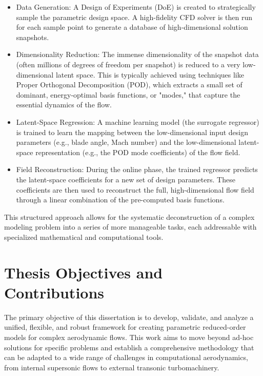 \documentclass[dscexam, EN]{ufabcFHZh}
\begin{document}
\begin{itemize}
    \item Data Generation: A Design of Experiments (DoE) is created to strategically sample the parametric design space. A high-fidelity CFD solver is then run for each sample point to generate a database of high-dimensional solution snapshots.
    
    \item Dimensionality Reduction: The immense dimensionality of the snapshot data (often millions of degrees of freedom per snapshot) is reduced to a very low-dimensional latent space. This is typically achieved using techniques like Proper Orthogonal Decomposition (POD), which extracts a small set of dominant, energy-optimal basis functions, or "modes," that capture the essential dynamics of the flow.

    \item Latent-Space Regression: A machine learning model (the surrogate regressor) is trained to learn the mapping between the low-dimensional input design parameters (e.g., blade angle, Mach number) and the low-dimensional latent-space representation (e.g., the POD mode coefficients) of the flow field.

    \item Field Reconstruction: During the online phase, the trained regressor predicts the latent-space coefficients for a new set of design parameters. These coefficients are then used to reconstruct the full, high-dimensional flow field through a linear combination of the pre-computed basis functions.
\end{itemize}

This structured approach allows for the systematic deconstruction of a complex modeling problem into a series of more manageable tasks, each addressable with specialized mathematical and computational tools.

\section{Thesis Objectives and Contributions}

The primary objective of this dissertation is to develop, validate, and analyze a unified, flexible, and robust framework for creating parametric reduced-order models for complex aerodynamic flows. This work aims to move beyond ad-hoc solutions for specific problems and establish a comprehensive methodology that can be adapted to a wide range of challenges in computational aerodynamics, from internal supersonic flows to external transonic turbomachinery.
\end{document}
